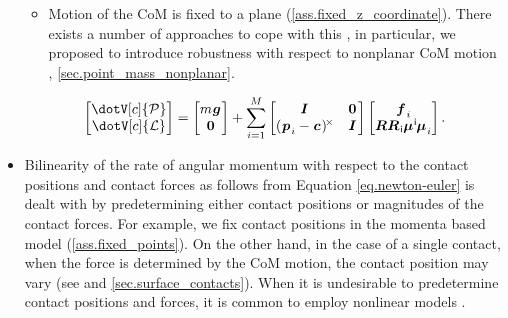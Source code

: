 \begin{itemize}
\begin{itemize}
            \item Motion of the \ac{CoM} is fixed to a plane
                (\cref{ass.fixed_z_coordinate}). There exists a number of
                approaches to cope with this \cite{Nishiwaki2011icra,
                Feng2013humanoids}, in particular, we proposed to introduce
                robustness with respect to nonplanar \ac{CoM} motion
                \cite{Brasseur2015humanoids}, \cref{sec.point_mass_nonplanar}.
        \end{itemize}

        \begin{equation}\label{eq.newton-euler}
            \begin{bmatrix}
                \dotV[c]{\LM} \\
                \dotV[c]{\AM}\\
            \end{bmatrix}
            =
            \begin{bmatrix}
                m\V{g}\\
                \V{0}
            \end{bmatrix}
            +
            \sum_{i=1}^M
                \begin{bmatrix}
                    \M{I}                     & \M{0}\\
                    \CROSS[(\contact_i - \V{c})]   & \M{I}
                \end{bmatrix}
                \begin{bmatrix}
                    \force_i\\
                    \M[i]{R} \moment[i]_i
                \end{bmatrix}.
        \end{equation}

    \item Bilinearity of the rate of angular momentum with respect to the
        contact positions and contact forces as follows from Equation
        \cref{eq.newton-euler} is dealt with by predetermining either contact
        positions or magnitudes of the contact forces. For example, we fix
        contact positions in the momenta based model (\cref{ass.fixed_points}).
        On the other hand, in the case of a single contact, when the force is
        determined by the \ac{CoM} motion, the contact position may vary (see
        \cite{Herdt2010auro} and \cref{sec.surface_contacts}). When it is
        undesirable to predetermine contact positions and forces, it is common
        to employ nonlinear models \cite{Dai2014humanoids, Tassa2014icra}.
\end{itemize}
%

